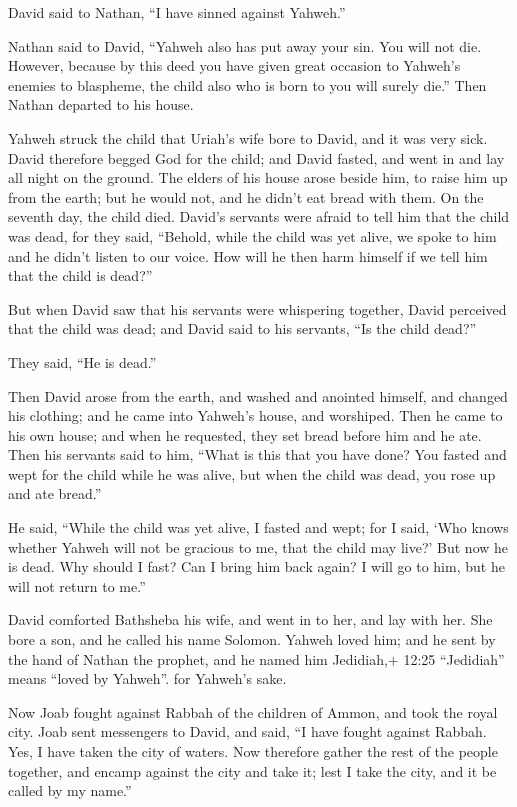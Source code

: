  David said to Nathan, ``I have sinned against Yahweh.''

Nathan said to David, ``Yahweh also has put away your sin. You will not
die.  However, because by this deed you have given great
occasion to Yahweh's enemies to blaspheme, the child also who is born to
you will surely die.''  Then Nathan departed to his house.

Yahweh struck the child that Uriah's wife bore to David, and it was very
sick.  David therefore begged God for the child; and David
fasted, and went in and lay all night on the ground.  The
elders of his house arose beside him, to raise him up from the earth;
but he would not, and he didn't eat bread with them.  On
the seventh day, the child died. David's servants were afraid to tell
him that the child was dead, for they said, ``Behold, while the child
was yet alive, we spoke to him and he didn't listen to our voice. How
will he then harm himself if we tell him that the child is dead?''

 But when David saw that his servants were whispering
together, David perceived that the child was dead; and David said to his
servants, ``Is the child dead?''

They said, ``He is dead.''

 Then David arose from the earth, and washed and anointed
himself, and changed his clothing; and he came into Yahweh's house, and
worshiped. Then he came to his own house; and when he requested, they
set bread before him and he ate.  Then his servants said to
him, ``What is this that you have done? You fasted and wept for the
child while he was alive, but when the child was dead, you rose up and
ate bread.''

 He said, ``While the child was yet alive, I fasted and
wept; for I said, `Who knows whether Yahweh will not be gracious to me,
that the child may live?'  But now he is dead. Why should I
fast? Can I bring him back again? I will go to him, but he will not
return to me.''

 David comforted Bathsheba his wife, and went in to her,
and lay with her. She bore a son, and he called his name Solomon. Yahweh
loved him;  and he sent by the hand of Nathan the prophet,
and he named him Jedidiah,+ 12:25 ``Jedidiah'' means ``loved by
Yahweh''. for Yahweh's sake.

 Now Joab fought against Rabbah of the children of Ammon,
and took the royal city.  Joab sent messengers to David,
and said, ``I have fought against Rabbah. Yes, I have taken the city of
waters.  Now therefore gather the rest of the people
together, and encamp against the city and take it; lest I take the city,
and it be called by my name.''

